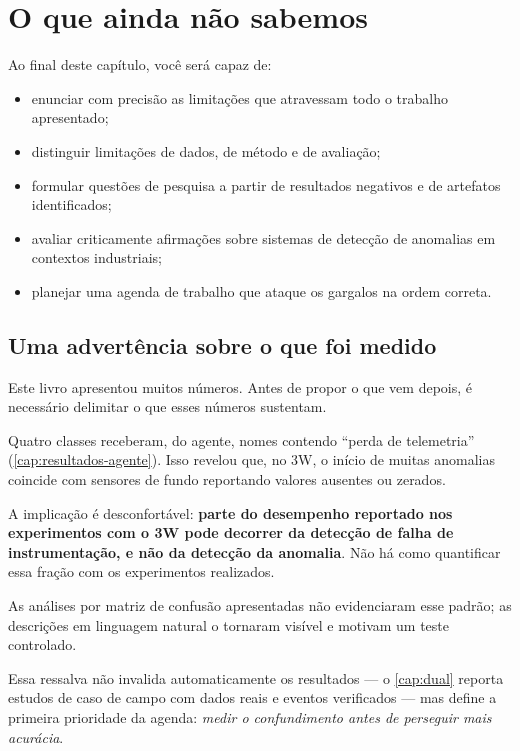 \chapter{O que ainda não sabemos}
\label{cap:futuro}

\begin{objetivos}
Ao final deste capítulo, você será capaz de:
\begin{itemize}[leftmargin=*,itemsep=0.2em]
  \item enunciar com precisão as limitações que atravessam todo o trabalho apresentado;
  \item distinguir limitações de dados, de método e de avaliação;
  \item formular questões de pesquisa a partir de resultados negativos e de artefatos
        identificados;
  \item avaliar criticamente afirmações sobre sistemas de detecção de anomalias em
        contextos industriais;
  \item planejar uma agenda de trabalho que ataque os gargalos na ordem correta.
\end{itemize}
\end{objetivos}

\section{Uma advertência sobre o que foi medido}

Este livro apresentou muitos números. Antes de propor o que vem depois, é necessário
delimitar o que esses números sustentam.

\begin{destaque}
Quatro classes receberam, do agente, nomes contendo ``perda de telemetria''
(\cref{cap:resultados-agente}). Isso revelou que, no 3W, o início de muitas anomalias
coincide com sensores de fundo reportando valores ausentes ou zerados.

A implicação é desconfortável: \textbf{parte do desempenho reportado nos experimentos
com o 3W pode decorrer da detecção de falha de instrumentação, e não da detecção da
anomalia}. Não há como quantificar essa fração com os experimentos realizados.

As análises por matriz de confusão apresentadas não evidenciaram esse padrão; as
descrições em linguagem natural o tornaram visível e motivam um teste controlado.
\end{destaque}

Essa ressalva não invalida automaticamente os resultados --- o \cref{cap:dual} reporta
estudos de caso de campo com dados reais e eventos verificados --- mas define a primeira
prioridade da agenda: \emph{medir o confundimento antes de perseguir mais acurácia}.

